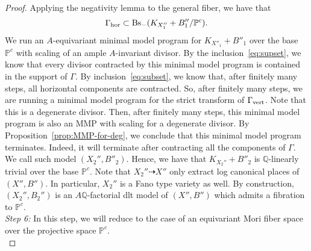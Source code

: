 \documentclass{amsart}
\newcommand{\pp}{\mathbb{P}}
\renewcommand{\qq}{\mathbb{Q}}
\theoremstyle{remark}
\numberwithin{equation}{section}
\begin{document}
\begin{proof}
Applying the negativity lemma to the general fiber, we have that
\begin{equation}\label{eq:subset} 
\Gamma_{\rm hor}\subset {\rm Bs}_{-}(K_{X_1''}+B_1''/\pp^c).
\end{equation} 
We run an $A$-equivariant minimal model program for
$K_{X''_1}+B''_1$ over the base $\pp^c$ with scaling of an ample $A$-invariant divisor.
By the inclusion~\ref{eq:supset}, we know that every divisor contracted by this minimal model program is contained in the support of $\Gamma$.
By inclusion~\ref{eq:subset}, we know that, after finitely many steps, all horizontal components are contracted.
So, after finitely many steps,
we are running a minimal model program for the strict transform of $\Gamma_{\rm vert}$.
Note that this is a degenerate divisor.
Then, after finitely many steps, 
this minimal model program is also an MMP
with scaling for a degenerate divisor.
By Proposition~\ref{prop:MMP-for-deg}, we conclude that this minimal model program terminates.
Indeed, it will terminate after contracting all the components of $\Gamma$.
We call such model $(X_2'',B''_2)$.
Hence, we have that $K_{X_2''}+B''_2$ is $\qq$-linearly trivial over the base $\pp^c$.
Note that $X_2''\dashrightarrow X''$ only extract log canonical places
of $(X'',B'')$. 
In particular, $X_2''$ is a Fano type variety as well.
By construction, $(X_2'',B_2'')$ is an $A\qq$-factorial dlt model
of $(X'',B'')$ which admits a fibration to $\pp^c$.\\

\textit{Step 6:} In this step, we will reduce to the case of an equivariant Mori fiber space over the projective space $\pp^c$.\\


\end{proof}
\end{document}
